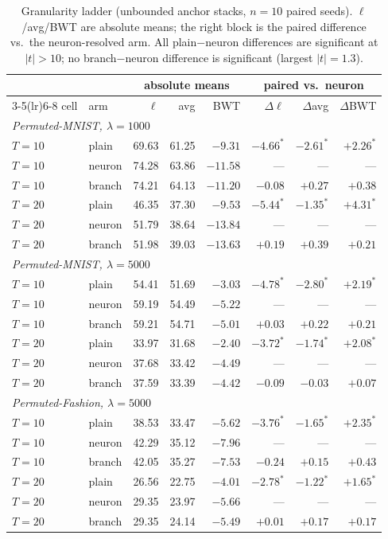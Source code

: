\documentclass[review,12pt,number]{elsarticle}
\begin{document}
\begin{table}[t]
\centering\footnotesize\setlength{\tabcolsep}{4.5pt}
\caption{Granularity ladder (unbounded anchor stacks, $n{=}10$ paired
seeds). $\ell$/avg/BWT are absolute means; the right block is the paired
difference vs.\ the neuron-resolved arm. All plain$-$neuron differences are
significant at $|t|>10$; no branch$-$neuron difference is significant
(largest $|t| = 1.3$).}
\label{tab:gran}
\begin{tabular}{llrrrr rr}
\toprule
 & & \multicolumn{3}{c}{absolute means} & \multicolumn{3}{c}{paired vs.\ neuron} \\
\cmidrule(lr){3-5}\cmidrule(lr){6-8}
cell & arm & $\ell$ & avg & BWT & $\Delta\ell$ & $\Delta$avg & $\Delta$BWT \\
\midrule
\multicolumn{8}{l}{\emph{Permuted-MNIST, $\lambda{=}1000$}}\\
$T{=}10$ & plain  & 69.63 & 61.25 & $-9.31$ & $-4.66^{*}$ & $-2.61^{*}$ & $+2.26^{*}$ \\
$T{=}10$ & neuron & 74.28 & 63.86 & $-11.58$ & --- & --- & --- \\
$T{=}10$ & branch & 74.21 & 64.13 & $-11.20$ & $-0.08$ & $+0.27$ & $+0.38$ \\
$T{=}20$ & plain  & 46.35 & 37.30 & $-9.53$ & $-5.44^{*}$ & $-1.35^{*}$ & $+4.31^{*}$ \\
$T{=}20$ & neuron & 51.79 & 38.64 & $-13.84$ & --- & --- & --- \\
$T{=}20$ & branch & 51.98 & 39.03 & $-13.63$ & $+0.19$ & $+0.39$ & $+0.21$ \\
\midrule
\multicolumn{8}{l}{\emph{Permuted-MNIST, $\lambda{=}5000$}}\\
$T{=}10$ & plain  & 54.41 & 51.69 & $-3.03$ & $-4.78^{*}$ & $-2.80^{*}$ & $+2.19^{*}$ \\
$T{=}10$ & neuron & 59.19 & 54.49 & $-5.22$ & --- & --- & --- \\
$T{=}10$ & branch & 59.21 & 54.71 & $-5.01$ & $+0.03$ & $+0.22$ & $+0.21$ \\
$T{=}20$ & plain  & 33.97 & 31.68 & $-2.40$ & $-3.72^{*}$ & $-1.74^{*}$ & $+2.08^{*}$ \\
$T{=}20$ & neuron & 37.68 & 33.42 & $-4.49$ & --- & --- & --- \\
$T{=}20$ & branch & 37.59 & 33.39 & $-4.42$ & $-0.09$ & $-0.03$ & $+0.07$ \\
\midrule
\multicolumn{8}{l}{\emph{Permuted-Fashion, $\lambda{=}5000$}}\\
$T{=}10$ & plain  & 38.53 & 33.47 & $-5.62$ & $-3.76^{*}$ & $-1.65^{*}$ & $+2.35^{*}$ \\
$T{=}10$ & neuron & 42.29 & 35.12 & $-7.96$ & --- & --- & --- \\
$T{=}10$ & branch & 42.05 & 35.27 & $-7.53$ & $-0.24$ & $+0.15$ & $+0.43$ \\
$T{=}20$ & plain  & 26.56 & 22.75 & $-4.01$ & $-2.78^{*}$ & $-1.22^{*}$ & $+1.65^{*}$ \\
$T{=}20$ & neuron & 29.35 & 23.97 & $-5.66$ & --- & --- & --- \\
$T{=}20$ & branch & 29.35 & 24.14 & $-5.49$ & $+0.01$ & $+0.17$ & $+0.17$ \\
\bottomrule
\end{tabular}
\end{table}
\end{document}
